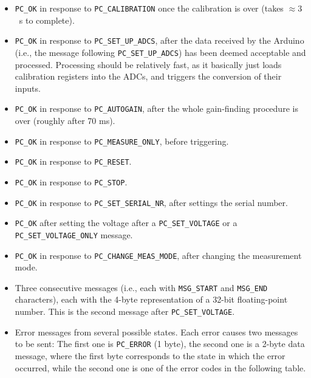 \documentclass[11pt,a4paper,english]{article}
\begin{document}
\begin{itemize}
\item \texttt{PC\_OK} in response to \texttt{PC\_CALIBRATION} once the calibration is over (takes $\approx3$~s to complete).
\item \texttt{PC\_OK} in response to \texttt{PC\_SET\_UP\_ADCS}, after the data received by the Arduino (i.e., the message following \texttt{PC\_SET\_UP\_ADCS}) has been deemed acceptable and processed. Processing should be relatively fast, as it basically just loads calibration registers into the ADCs, and triggers the conversion of their inputs.
\item \texttt{PC\_OK} in response to \texttt{PC\_AUTOGAIN}, after the whole gain-finding procedure is over (roughly after 70 ms).
\item \texttt{PC\_OK} in response to \texttt{PC\_MEASURE\_ONLY}, before triggering.
\item \texttt{PC\_OK} in response to \texttt{PC\_RESET}.
\item \texttt{PC\_OK} in response to \texttt{PC\_STOP}.
\item \texttt{PC\_OK} in response to \texttt{PC\_SET\_SERIAL\_NR}, after settings the serial number.
\item \texttt{PC\_OK} after setting the voltage after a \texttt{PC\_SET\_VOLTAGE} or a \texttt{PC\_SET\_VOLTAGE\_ONLY} message.
\item \texttt{PC\_OK} in response to \texttt{PC\_CHANGE\_MEAS\_MODE}, after changing the measurement mode.
\item Three consecutive messages (i.e., each with \texttt{MSG\_START} and \texttt{MSG\_END} characters), each with the 4-byte representation of a 32-bit floating-point number. This is the second message after \texttt{PC\_SET\_VOLTAGE}.
\item Error messages from several possible states. Each error causes two messages to be sent: The first one is \texttt{PC\_ERROR} (1 byte), the second one is a 2-byte data message, where the first byte corresponds to the state in which the error occurred, while the second one is one of the error codes in the following table.


\end{itemize}
\end{document}
